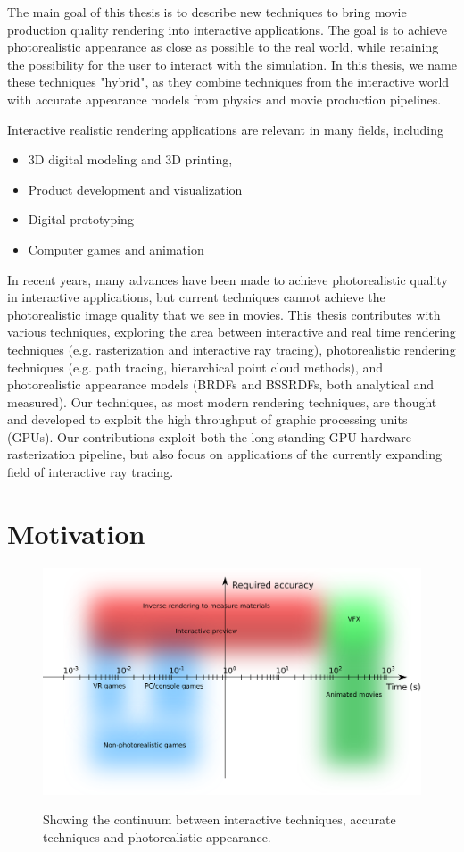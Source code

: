 The main goal of this thesis is to describe new techniques to bring movie production quality rendering into interactive applications.  The goal is to achieve photorealistic appearance as close as possible to the real world, while retaining the possibility for the user to interact with the simulation. In this thesis, we name these techniques "hybrid", as they combine techniques from the interactive world with accurate appearance models from physics and movie production pipelines.

Interactive realistic rendering applications are relevant in many fields, including
\begin{itemize}
\item 3D digital modeling and 3D printing,
\item Product development and visualization
\item Digital prototyping
\item Computer games and animation
\end{itemize}
In recent years, many advances have been made to achieve photorealistic quality in interactive applications,  but current techniques cannot achieve the photorealistic image quality that we see in movies. This thesis contributes with various techniques, exploring the area between interactive and real time rendering techniques (e.g. rasterization and interactive ray tracing), photorealistic rendering techniques (e.g. path tracing, hierarchical point cloud methods), and photorealistic appearance models (BRDFs and BSSRDFs, both analytical and measured). Our techniques, as most modern rendering techniques, are thought and developed to exploit the high throughput of graphic processing units (GPUs). Our contributions exploit both the long standing GPU hardware rasterization pipeline, but also focus on applications of the currently expanding field of interactive ray tracing. 

\section{Motivation}

\begin{figure}
\centering
	 \includegraphics[width=\textwidth]{figures/photorealistic_diagram.png}  \\
\caption{Showing the continuum between interactive techniques, accurate techniques and photorealistic appearance.} 
\label{fig:main_diagram}
\end{figure}

